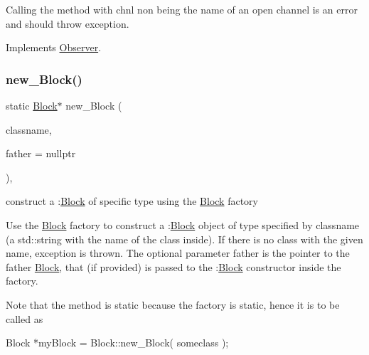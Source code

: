 Calling the method with chnl non being the name of an open channel is an error and should throw exception. 

Implements \mbox{\hyperlink{class_s_m_spp__di__unipi__it_1_1_observer_a4869c34f8f2a2286c39fdce0521b93c9}{Observer}}.

\mbox{\label{class_s_m_spp__di__unipi__it_1_1_block_a0fb67cbfab69b75e3bc6ad92d581bd2e}} 
\subsubsection{\texorpdfstring{new\+\_\+\+Block()}{new\_Block()}\hspace{0.1cm}{\footnotesize\ttfamily [1/2]}}
{\footnotesize\ttfamily static \mbox{\hyperlink{class_s_m_spp__di__unipi__it_1_1_block}{Block}}$\ast$ new\+\_\+\+Block (\begin{DoxyParamCaption}\item[{const std\+::string \&}]{classname,  }\item[{\mbox{\hyperlink{class_s_m_spp__di__unipi__it_1_1_block}{Block}} $\ast$}]{father = {\ttfamily nullptr} }\end{DoxyParamCaption})\hspace{0.3cm}{\ttfamily [inline]}, {\ttfamily [static]}}



construct a \+:\mbox{\hyperlink{class_s_m_spp__di__unipi__it_1_1_block}{Block}} of specific type using the \mbox{\hyperlink{class_s_m_spp__di__unipi__it_1_1_block}{Block}} factory 

Use the \mbox{\hyperlink{class_s_m_spp__di__unipi__it_1_1_block}{Block}} factory to construct a \+:\mbox{\hyperlink{class_s_m_spp__di__unipi__it_1_1_block}{Block}} object of type specified by classname (a std\+::string with the name of the class inside). If there is no class with the given name, exception is thrown. The optional parameter father is the pointer to the father \mbox{\hyperlink{class_s_m_spp__di__unipi__it_1_1_block}{Block}}, that (if provided) is passed to the \+:\mbox{\hyperlink{class_s_m_spp__di__unipi__it_1_1_block}{Block}} constructor inside the factory.

Note that the method is static because the factory is static, hence it is to be called as \begin{DoxyVerb}  Block *myBlock = Block::new_Block( someclass );
\end{DoxyVerb}


